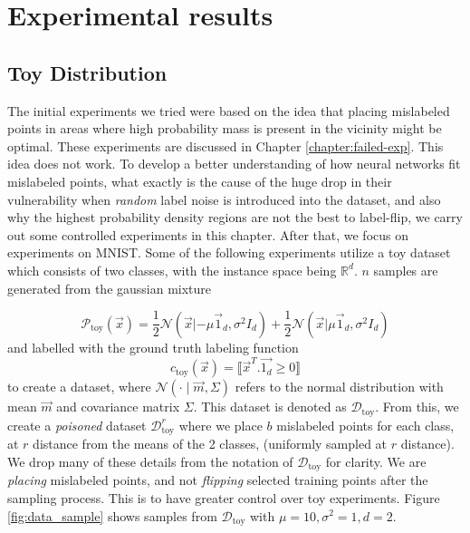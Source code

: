\documentclass{ociamthesis}
\begin{document}
\chapter{Experimental results}
\label{chapter:experiments}

\section{Toy Distribution}

The initial experiments we tried were based on the idea that placing mislabeled
points in areas where high probability mass is present in the vicinity might be
optimal. These experiments are discussed in Chapter \ref{chapter:failed-exp}.
This idea does not work. To develop a better understanding of how neural
networks fit mislabeled points, what exactly is the cause of the huge drop in
their vulnerability when \emph{random} label noise is introduced into the
dataset, and also why the highest probability density regions are not the best
to label-flip, we carry out some controlled experiments in this chapter. After
that, we focus on experiments on MNIST. Some of the following experiments
utilize a toy dataset which consists of two classes, with the instance space
being $\mathbb{R}^d$. $n$ samples are generated from the gaussian mixture

\begin{equation*}
    \mathcal{P}_\text{toy}(\vec{x})=\frac{1}{2} \mathcal{N}(\vec{x}|-\mu \vec{1}_d,
    \sigma^2 I_d) + \frac{1}{2} \mathcal{N}(\vec{x}| \mu \vec{1}_d, \sigma^2 I_d)
\end{equation*}
and labelled with the ground truth labeling function 
\begin{equation*}
    c_\text{toy}(\vec{x}) = \llbracket
    \vec{x}^T.\vec{1_d} \geq 0 \rrbracket 
\end{equation*}
to create a dataset, where $\mathcal{N}(\cdot \mid \vec{m}, \Sigma)$ refers to
the normal distribution with mean $\vec{m}$ and covariance matrix $\Sigma$. This
dataset is denoted as $\mathcal{D}_\text{toy}$. From this, we create a
\emph{poisoned} dataset $\mathcal{D}_\text{toy}^r$ where we place $b$ mislabeled
points for each class, at $r$ distance from the means of the 2 classes,
(uniformly sampled at $r$ distance). We drop many of these details from the
notation of $\mathcal{D}_\text{toy}$ for clarity. We are \emph{placing}
mislabeled points, and not \emph{flipping} selected training points after the
sampling process. This is to have greater control over toy experiments. Figure
\ref{fig:data_sample} shows samples from $\mathcal{D}_\text{toy}$ with $\mu=10,
\sigma^2=1, d=2$.
\end{document}
